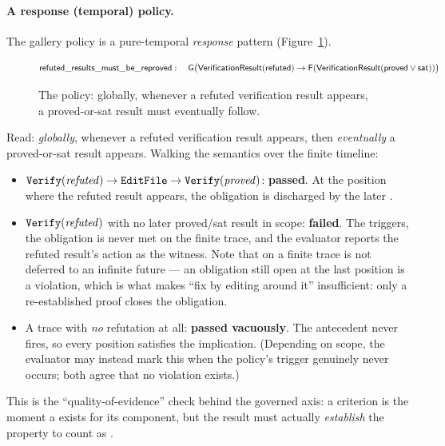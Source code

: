 \paragraph{A response (temporal) policy.}
The gallery policy  is a pure-temporal
\emph{response} pattern (Figure~\ref{fig:pol-reproved}).
\begin{figure}[H]
\centering
\small
\[ \mathsf{refuted\_results\_must\_be\_reproved}:\quad
\mathsf{G}\big(\mathsf{VerificationResult}(\mathsf{refuted}) \rightarrow \mathsf{F}(\mathsf{VerificationResult}(\mathsf{proved} \lor \mathsf{sat}))\big) \]
\caption{The  policy: globally, whenever a refuted verification result appears, a proved-or-sat result must eventually follow.}
\label{fig:pol-reproved}
\end{figure}
Read: \emph{globally}, whenever a refuted verification result appears, then
\emph{eventually} a proved-or-sat result appears. Walking the semantics over the
finite timeline:
\begin{itemize}
\item \(\code{Verify}(\mathit{refuted}) \to \code{EditFile} \to
\code{Verify}(\mathit{proved})\): \textbf{passed}. At the position where the
refuted result appears, the  obligation is discharged by the later
.
\item \(\code{Verify}(\mathit{refuted})\) with no later proved/sat result in
scope: \textbf{failed}. The  triggers, the  obligation is never
met on the finite trace, and the evaluator reports the refuted result's action as
the witness. Note that on a finite trace  is not deferred to an infinite
future --- an obligation still open at the last position is a violation, which is
what makes ``fix by editing around it'' insufficient: only a re-established proof
closes the obligation.
\item A trace with \emph{no} refutation at all: \textbf{passed vacuously}. The
 antecedent never fires, so every position satisfies the implication.
(Depending on scope, the evaluator may instead mark this 
when the policy's trigger genuinely never occurs; both agree that no violation
exists.)
\end{itemize}
This is the ``quality-of-evidence'' check behind the governed axis: a criterion
is  the moment a  exists for its component, but
the result must actually \emph{establish} the property to count as .

